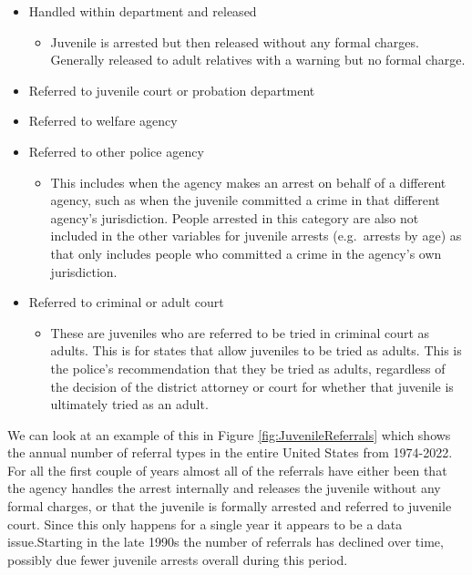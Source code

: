 \documentclass[
]{krantz}
\providecommand{\tightlist}{%
  \setlength{\itemsep}{0pt}\setlength{\parskip}{0pt}}
\begin{document}
\begin{itemize}
\tightlist
\item
  Handled within department and released

  \begin{itemize}
  \tightlist
  \item
    Juvenile is arrested but then released without any
    formal charges. Generally released to adult relatives
    with a warning but no formal charge.
  \end{itemize}
\item
  Referred to juvenile court or probation department
\item
  Referred to welfare agency
\item
  Referred to other police agency

  \begin{itemize}
  \tightlist
  \item
    This includes when the agency makes an arrest on behalf
    of a different agency, such as when the juvenile
    committed a crime in that different agency's
    jurisdiction. People arrested in this category are also
    not included in the other variables for juvenile arrests
    (e.g.~arrests by age) as that only includes people who
    committed a crime in the agency's own jurisdiction.
  \end{itemize}
\item
  Referred to criminal or adult court

  \begin{itemize}
  \tightlist
  \item
    These are juveniles who are referred to be tried in
    criminal court as adults. This is for states that allow
    juveniles to be tried as adults. This is the police's
    recommendation that they be tried as adults, regardless
    of the decision of the district attorney or court for
    whether that juvenile is ultimately tried as an adult.
  \end{itemize}
\end{itemize}

We can look at an example of this in Figure
\ref{fig:JuvenileReferrals} which shows the annual number of
referral types in the entire United States from 1974-2022.
For all the first couple of years almost all of the
referrals have either been that the agency handles the
arrest internally and releases the juvenile without any
formal charges, or that the juvenile is formally arrested
and referred to juvenile court. Since this only happens for
a single year it appears to be a data issue.Starting in the
late 1990s the number of referrals has declined over time,
possibly due fewer juvenile arrests overall during this
period.
\end{document}
